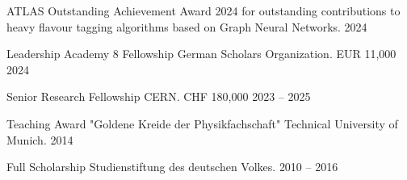 

\begin{cvhonors}

  \cvhonor
    {ATLAS Outstanding Achievement Award 2024} %
    {for outstanding contributions to heavy flavour tagging algorithms based on
    Graph Neural Networks.} %
    {} %
    {2024} %


  \cvhonor
    {Leadership Academy 8 Fellowship} %
    {German Scholars Organization.} %
    {EUR 11,000} %
    {2024} %


    \cvhonor
    {Senior Research Fellowship} %
    {CERN.} %
    {CHF 180,000} %
    {2023 -- 2025} %

  \cvhonor
    {Teaching Award "Goldene Kreide der Physikfachschaft"} %
    {Technical University of Munich.} %
    {} %
    {2014} %

  \cvhonor
    {Full Scholarship} %
    {Studienstiftung des deutschen Volkes.} %
    {} %
    {2010 -- 2016} %

\end{cvhonors}
